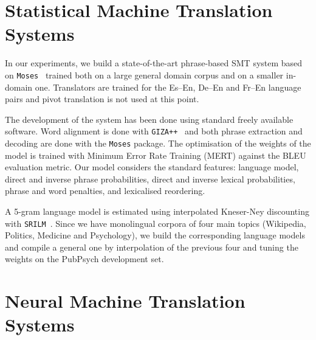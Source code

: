 \documentclass[a4paper,11pt]{article}
\begin{document}
\section{Statistical Machine Translation Systems}
\label{s:smt}

In our experiments, we build a state-of-the-art phrase-based SMT system based on {\tt Moses}~\cite{moses:2007} trained both on a large general domain corpus and on a smaller in-domain one. Translators are trained for the Es--En, De--En and Fr--En language pairs and pivot translation is not used at this point. 

The development of the system has been done using standard freely available software. 
Word alignment is done with {\tt GIZA++}~\cite{giza} and both phrase extraction and decoding are done with the {\tt Moses} package. The optimisation of the weights of the model is trained with  Minimum Error Rate Training (MERT) \cite{och2003} against the BLEU evaluation metric.  Our model considers the standard features: language model, direct and inverse phrase probabilities, direct and inverse lexical probabilities, phrase and word penalties, and lexicalised reordering.

A 5-gram language model is estimated using interpolated Kneser-Ney discounting with {\tt SRILM}~\cite{srilm}. Since we have monolingual corpora of four main topics (Wikipedia, Politics, Medicine and Psychology), we build the corresponding language models and compile a general one by interpolation of the previous four and tuning the weights on the PubPsych development set.

\subsection{}
\label{ss:}


\section{Neural Machine Translation Systems}
\label{s:nmt}
\end{document}
